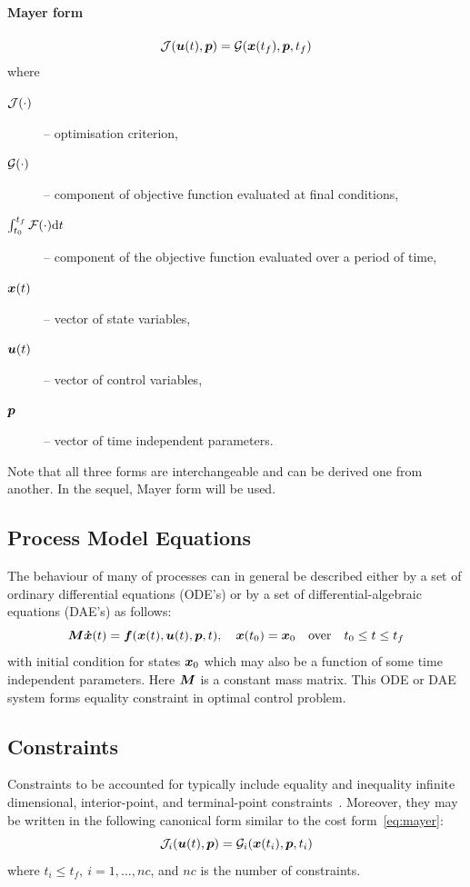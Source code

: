 \paragraph{Mayer form}
\begin{equation}
\mf{J}(\ve{u}(t),\ve{p}) = \mf{G}(\ve{x}(t_{f}),\ve{p},t_{f})
\label{eq:mayer} 
\end{equation}where
\begin{description}
\item[$\mathcal{J}(\cdot)$] -- optimisation criterion,
\item[$\mathcal{G}(\cdot)$] -- component of objective function evaluated at
  final conditions, 
\item[$\int_{t_{0}}^{t_{f}}\mathcal{F}(\cdot)\textnormal{\text{d}}{}t$] -- component of the
  objective 
  function evaluated over a period of time, 
\item[$\ve{x}(t)$] --  vector of state variables,
\item[$\ve{u}(t)$] -- vector of control variables,
\item[$\ve{p}$] -- vector of time independent parameters.
\end{description}
Note that all three forms are interchangeable and can be derived one
from another. In the sequel, Mayer form will be used.
 
\subsection{Process Model Equations}
\label{sec:pme}

The behaviour of many of processes can in general be described either
by a set of ordinary differential equations (ODE's) or by a set of
differential-algebraic equations (DAE's) as follows:
\begin{equation}
\ve{M\dot{x}}(t) = \ve{f}(\ve{x}(t),\ve{u}(t),\ve{p},t), \quad
\ve{x}(t_{0}) = \ve{x}_{0} \quad \textnormal{over} \quad t_{0} \leq t
\leq t_{f} \label{eq:process} 
\end{equation} with initial condition for states $\ve{x}_{0}$ which may
also be a function of some time independent parameters. Here $\ve{M}$
is a constant mass matrix. This ODE or DAE system forms equality constraint
in optimal control problem. 

\subsection{Constraints}
\label{sec:cons}

Constraints to be accounted for typically include
equality and inequality infinite dimensional, interior-point, and
terminal-point constraints~\cite{goh88}. Moreover, they may be written
in the following canonical form similar to the cost
form~\eqref{eq:mayer}: 
\begin{equation}
\mf{J}_{i}(\ve{u}(t),\ve{p}) = \mf{G}_{i}(\ve{x}(t_{i}),\ve{p},t_{i}) 
\label{eq:constraints} 
\end{equation} where $t_{i} \leq t_{f},~i=1,\ldots,nc$, and $nc$ is
the number of constraints.

